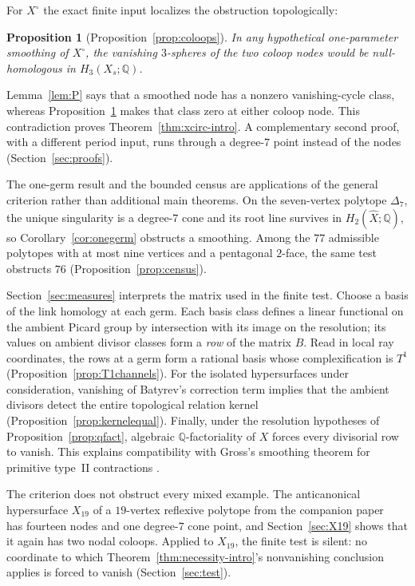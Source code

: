 \documentclass[11pt]{amsart}
\newtheorem{proposition}[theorem]{Proposition}
\theoremstyle{definition}
\theoremstyle{remark}
\theoremstyle{plain}
\newcommand{\QQ}{\mathbb{Q}}
\newcommand{\Xh}{\widehat{X}}
\begin{document}
For $X^{\circ}$ the exact finite input localizes the obstruction
topologically:

\begin{proposition}[Proposition~\ref{prop:coloops}]
\label{prop:coloops-intro}
In any hypothetical one-parameter smoothing of $X^{\circ}$, the
vanishing $3$-spheres of the two coloop nodes would be null-homologous
in $H_3(X_s;\QQ)$.
\end{proposition}

Lemma~\ref{lem:P} says that a smoothed node has a nonzero vanishing-cycle
class, whereas Proposition~\ref{prop:coloops-intro} makes that class zero at
either coloop node.  This contradiction proves
Theorem~\ref{thm:xcirc-intro}.  A
complementary second proof, with a different period input, runs
through a degree-$7$ point instead of
the nodes (Section~\ref{sec:proofs}).

The one-germ result and the bounded census are applications of the general
criterion rather than additional main theorems.  On the seven-vertex polytope
$\Delta_7$, the unique singularity is a degree-$7$ cone and its root line
survives in $H_2(\Xh;\QQ)$, so Corollary~\ref{cor:onegerm} obstructs a
smoothing.  Among the $77$ admissible polytopes with at most nine vertices and
a pentagonal $2$-face, the same test obstructs $76$
(Proposition~\ref{prop:census}).

Section~\ref{sec:measures} interprets the matrix used in the finite test.
Choose a basis of the link homology at each germ.  Each basis class defines
a linear functional on the ambient Picard group by intersection with its
image on the resolution; its values on ambient divisor classes form a
\emph{row} of the matrix $B$.  Read in local ray coordinates, the rows at a
germ form a rational basis whose complexification is $T^1$
(Proposition~\ref{prop:T1channels}).  For the isolated hypersurfaces under
consideration, vanishing of Batyrev's correction term implies that the
ambient divisors detect the entire topological relation kernel
(Proposition~\ref{prop:kernelequal}).  Finally, under the resolution
hypotheses of Proposition~\ref{prop:qfact}, algebraic $\QQ$-factoriality of
$X$ forces every divisorial row to vanish.  This explains compatibility
with Gross's smoothing theorem for primitive type~II contractions
\cite[Theorem~5.8]{Gross97}.

The criterion does not obstruct every mixed example.  The anticanonical
hypersurface $X_{19}$ of a $19$-vertex reflexive polytope from the
companion paper~\cite{PaperIII} has fourteen nodes and one degree-$7$
cone point, and Section~\ref{sec:X19} shows that it again has two nodal
coloops.  Applied to $X_{19}$, the finite test is
silent: no coordinate to which Theorem~\ref{thm:necessity-intro}'s
nonvanishing conclusion applies is forced to vanish
(Section~\ref{sec:test}).
\end{document}
